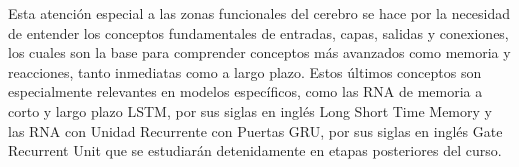 Esta atención especial a las zonas funcionales del cerebro se hace por la necesidad de entender los conceptos fundamentales de entradas, capas, salidas y conexiones, los cuales son la base para comprender conceptos más avanzados como memoria y reacciones, tanto inmediatas como a largo plazo. Estos últimos conceptos son especialmente relevantes en modelos específicos, como las RNA de memoria a corto y largo plazo LSTM, por sus siglas en inglés Long Short Time Memory \parencite{aprend_Olv}
 y las RNA con Unidad Recurrente con Puertas GRU, por sus siglas en inglés Gate Recurrent Unit \parencite{GRUlearning}  que se estudiarán detenidamente en etapas posteriores del curso.







